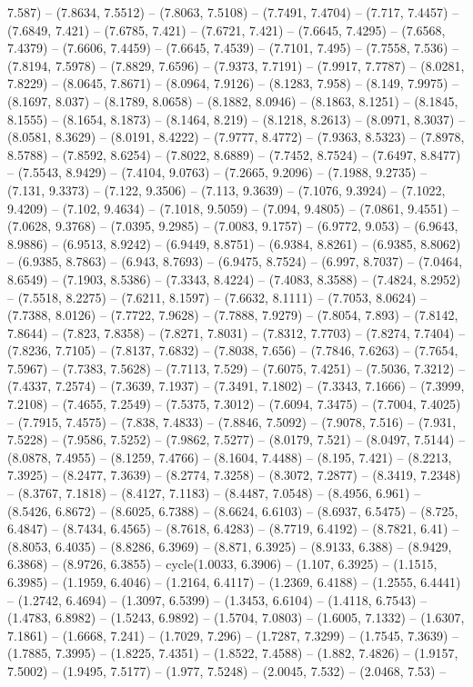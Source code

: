 7.587) -- (7.8634, 7.5512) -- (7.8063, 7.5108) -- (7.7491, 7.4704) -- (7.717, 7.4457) -- (7.6849, 7.421) -- (7.6785, 7.421) -- (7.6721, 7.421) -- (7.6645, 7.4295) -- (7.6568, 7.4379) -- (7.6606, 7.4459) -- (7.6645, 7.4539) -- (7.7101, 7.495) -- (7.7558, 7.536) -- (7.8194, 7.5978) -- (7.8829, 7.6596) -- (7.9373, 7.7191) -- (7.9917, 7.7787) -- (8.0281, 7.8229) -- (8.0645, 7.8671) -- (8.0964, 7.9126) -- (8.1283, 7.958) -- (8.149, 7.9975) -- (8.1697, 8.037) -- (8.1789, 8.0658) -- (8.1882, 8.0946) -- (8.1863, 8.1251) -- (8.1845, 8.1555) -- (8.1654, 8.1873) -- (8.1464, 8.219) -- (8.1218, 8.2613) -- (8.0971, 8.3037) -- (8.0581, 8.3629) -- (8.0191, 8.4222) -- (7.9777, 8.4772) -- (7.9363, 8.5323) -- (7.8978, 8.5788) -- (7.8592, 8.6254) -- (7.8022, 8.6889) -- (7.7452, 8.7524) -- (7.6497, 8.8477) -- (7.5543, 8.9429) -- (7.4104, 9.0763) -- (7.2665, 9.2096) -- (7.1988, 9.2735) -- (7.131, 9.3373) -- (7.122, 9.3506) -- (7.113, 9.3639) -- (7.1076, 9.3924) -- (7.1022, 9.4209) -- (7.102, 9.4634) -- (7.1018, 9.5059) -- (7.094, 9.4805) -- (7.0861, 9.4551) -- (7.0628, 9.3768) -- (7.0395, 9.2985) -- (7.0083, 9.1757) -- (6.9772, 9.053) -- (6.9643, 8.9886) -- (6.9513, 8.9242) -- (6.9449, 8.8751) -- (6.9384, 8.8261) -- (6.9385, 8.8062) -- (6.9385, 8.7863) -- (6.943, 8.7693) -- (6.9475, 8.7524) -- (6.997, 8.7037) -- (7.0464, 8.6549) -- (7.1903, 8.5386) -- (7.3343, 8.4224) -- (7.4083, 8.3588) -- (7.4824, 8.2952) -- (7.5518, 8.2275) -- (7.6211, 8.1597) -- (7.6632, 8.1111) -- (7.7053, 8.0624) -- (7.7388, 8.0126) -- (7.7722, 7.9628) -- (7.7888, 7.9279) -- (7.8054, 7.893) -- (7.8142, 7.8644) -- (7.823, 7.8358) -- (7.8271, 7.8031) -- (7.8312, 7.7703) -- (7.8274, 7.7404) -- (7.8236, 7.7105) -- (7.8137, 7.6832) -- (7.8038, 7.656) -- (7.7846, 7.6263) -- (7.7654, 7.5967) -- (7.7383, 7.5628) -- (7.7113, 7.529) -- (7.6075, 7.4251) -- (7.5036, 7.3212) -- (7.4337, 7.2574) -- (7.3639, 7.1937) -- (7.3491, 7.1802) -- (7.3343, 7.1666) -- (7.3999, 7.2108) -- (7.4655, 7.2549) -- (7.5375, 7.3012) -- (7.6094, 7.3475) -- (7.7004, 7.4025) -- (7.7915, 7.4575) -- (7.838, 7.4833) -- (7.8846, 7.5092) -- (7.9078, 7.516) -- (7.931, 7.5228) -- (7.9586, 7.5252) -- (7.9862, 7.5277) -- (8.0179, 7.521) -- (8.0497, 7.5144) -- (8.0878, 7.4955) -- (8.1259, 7.4766) -- (8.1604, 7.4488) -- (8.195, 7.421) -- (8.2213, 7.3925) -- (8.2477, 7.3639) -- (8.2774, 7.3258) -- (8.3072, 7.2877) -- (8.3419, 7.2348) -- (8.3767, 7.1818) -- (8.4127, 7.1183) -- (8.4487, 7.0548) -- (8.4956, 6.961) -- (8.5426, 6.8672) -- (8.6025, 6.7388) -- (8.6624, 6.6103) -- (8.6937, 6.5475) -- (8.725, 6.4847) -- (8.7434, 6.4565) -- (8.7618, 6.4283) -- (8.7719, 6.4192) -- (8.7821, 6.41) -- (8.8053, 6.4035) -- (8.8286, 6.3969) -- (8.871, 6.3925) -- (8.9133, 6.388) -- (8.9429, 6.3868) -- (8.9726, 6.3855) -- cycle(1.0033, 6.3906) -- (1.107, 6.3925) -- (1.1515, 6.3985) -- (1.1959, 6.4046) -- (1.2164, 6.4117) -- (1.2369, 6.4188) -- (1.2555, 6.4441) -- (1.2742, 6.4694) -- (1.3097, 6.5399) -- (1.3453, 6.6104) -- (1.4118, 6.7543) -- (1.4783, 6.8982) -- (1.5243, 6.9892) -- (1.5704, 7.0803) -- (1.6005, 7.1332) -- (1.6307, 7.1861) -- (1.6668, 7.241) -- (1.7029, 7.296) -- (1.7287, 7.3299) -- (1.7545, 7.3639) -- (1.7885, 7.3995) -- (1.8225, 7.4351) -- (1.8522, 7.4588) -- (1.882, 7.4826) -- (1.9157, 7.5002) -- (1.9495, 7.5177) -- (1.977, 7.5248) -- (2.0045, 7.532) -- (2.0468, 7.53) -- 